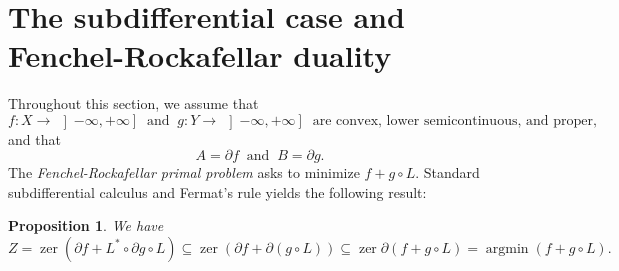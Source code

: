 \documentclass{article}
\newcommand{\RX}{\ensuremath{\,\left]-\infty,+\infty\right]}}
\DeclareMathOperator*{\argmin}{argmin}
\newcommand{\zer}{\ensuremath{\operatorname{zer}}}
\newtheorem{proposition}[theorem]{Proposition}
\begin{document}
\section{The subdifferential case and Fenchel-Rockafellar duality}

\label{s:subdiffs}


Throughout this section, we assume that 
\begin{equation}
f\colon X\to\RX 
\;\; \text{and}\;\;
g\colon Y\to\RX 
\;\;\text{are convex, lower semicontinuous, and proper,}
\end{equation}
and that 
\begin{equation}
A = \partial f
\;\; \text{and}\;\;
B = \partial g. 
\end{equation}
The \emph{Fenchel-Rockafellar primal problem} asks to minimize
$f+g\circ L$. 
Standard subdifferential calculus and Fermat's rule yields the 
following result:
\begin{proposition}
\label{p:fgincl}
We have 
\begin{equation}
Z = \zer(\partial f + L^*\circ\partial g\circ L)
\subseteq 
\zer(\partial f+\partial(g\circ L))
\subseteq 
\zer\partial(f+g\circ L) = 
\argmin (f+g\circ L). 
\end{equation}
\end{proposition}
\end{document}
